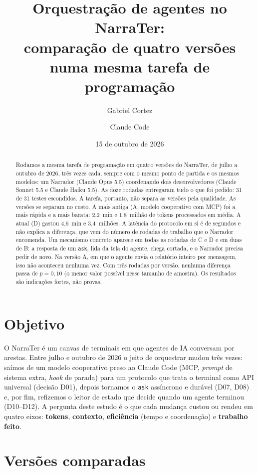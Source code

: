 \documentclass[11pt,a4paper]{article}
\title{Orquestração de agentes no NarraTer:\\[2pt] \large comparação de quatro versões numa mesma tarefa de programação}
\author{Gabriel Cortez \and Claude Code}
\date{15 de outubro de 2026}
\begin{document}
\maketitle

\begin{abstract}
\noindent
Rodamos a mesma tarefa de programação em quatro versões do NarraTer, de julho a outubro de 2026,
três vezes cada, sempre com o mesmo ponto de partida e os mesmos modelos: um Narrador (Claude Opus 5.5)
coordenando dois desenvolvedores (Claude Sonnet 5.5 e Claude Haiku 5.5). As doze rodadas
entregaram tudo o que foi pedido: 31 de 31 testes escondidos. A tarefa, portanto, não separa as
versões pela qualidade. As versões se separam no custo. A mais antiga (A, modelo cooperativo com MCP)
foi a mais rápida e a mais barata: 2,2~min e 1,8~milhão de tokens processados em média.
A atual (D) gastou 4,6~min e 3,4~milhões. A latência do protocolo em si é de segundos e não explica
a diferença, que vem do número de rodadas de trabalho que o Narrador encomenda. Um mecanismo
concreto aparece em todas as rodadas de C e D e em duas de B: a resposta de um \texttt{ask}, lida da
tela do agente, chega cortada, e o Narrador precisa pedir de novo. Na versão A, em que o agente envia
o relatório inteiro por mensagem, isso não aconteceu nenhuma vez. Com três rodadas por versão,
nenhuma diferença passa de $p=0{,}10$ (o menor valor possível nesse tamanho de amostra). Os
resultados são indicações fortes, não provas.
\end{abstract}

\section{Objetivo}

O NarraTer é um canvas de terminais em que agentes de IA conversam por arestas. Entre julho e outubro
de 2026 o jeito de orquestrar mudou três vezes: saímos de um modelo cooperativo preso ao Claude Code
(MCP, \emph{prompt} de sistema extra, \emph{hook} de parada) para um protocolo que trata o terminal
como API universal (decisão D01), depois tornamos o \texttt{ask} assíncrono e durável (D07, D08) e,
por fim, refizemos o leitor de estado que decide quando um agente terminou (D10--D12). A pergunta
deste estudo é o que cada mudança custou ou rendeu em quatro eixos: \textbf{tokens},
\textbf{contexto}, \textbf{eficiência} (tempo e coordenação) e \textbf{trabalho feito}.

\section{Versões comparadas}
\end{document}
